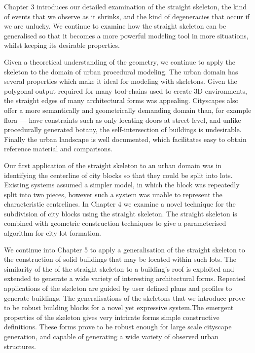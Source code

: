 
Chapter 3 introduces our detailed examination of the straight skeleton, the kind of events that we observe as it shrinks, and the kind of degeneracies that occur if we are unlucky. We continue to examine how the straight skeleton can be generalised so that it becomes a more powerful modeling tool in more situations, whilst keeping its desirable properties. 

Given a theoretical understanding of the geometry, we continue to apply the skeleton to the domain of urban procedural modeling. The urban domain has several properties which make it ideal for modeling with skeletons. Given the polygonal output required for many tool-chains used to create 3D environments, the straight edges of many architectural forms was appealing. Cityscapes also offer a more semantically and geometrically demanding domain than, for example flora --- \facades{} have constraints such as only locating doors at street level, and unlike procedurally generated botany, the self-intersection of buildings is undesirable. Finally the urban landscape is well documented, which facilitates easy to obtain reference material and comparisons.

Our first application of the straight skeleton to an urban domain was in identifying the centerline of city blocks so that they could be split into lots. Existing systems  assumed a simpler model, in which the block was repeatedly split into two pieces, however such a system was unable to represent the characteristic centrelines. In Chapter 4 we examine a novel technique for the subdivision of city blocks using the straight skeleton. The straight skeleton is combined with geometric construction techniques to give a parameterised algorithm for city lot formation.

We continue into Chapter 5 to apply a generalisation of the straight skeleton to the construction of solid buildings that may be located within such lots. The similarity of the of the straight skeleton to a building's roof is exploited and extended to generate a wide variety of interesting architectural forms. Repeated applications of the skeleton are guided by user defined plans and profiles to generate buildings. The generalisations of the skeletons that we introduce prove to be robust building blocks for a novel yet expressive system.The emergent properties of the skeleton gives very intricate forms simple constructive definitions. These forms prove to be robust enough for large scale cityscape generation, and capable of generating a wide variety of observed urban structures.



